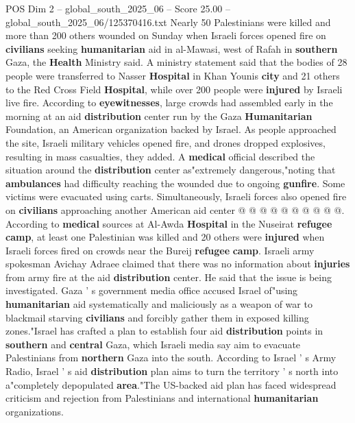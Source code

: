 \begin{textsample}{POS Dim 2 – global\_south\_2025\_06 – Score 25.00 – global\_south\_2025\_06/125370416.txt}  \label{ex:f2_pos_090}
Nearly 50 Palestinians were killed and more than 200 others wounded on Sunday when Israeli forces opened fire on \textbf{civilians} seeking \textbf{humanitarian} aid in al-Mawasi, west of Rafah in \textbf{southern} Gaza, the \textbf{Health} Ministry said.
A ministry statement said that the bodies of 28 people were transferred to Nasser \textbf{Hospital} in Khan Younis \textbf{city} and 21 others to the Red Cross Field \textbf{Hospital}, while over 200 people were \textbf{injured} by Israeli live fire.
According to \textbf{eyewitnesses}, large crowds had assembled early in the morning at an aid \textbf{distribution} center run by the Gaza \textbf{Humanitarian} Foundation, an American organization backed by Israel.
As people approached the site, Israeli military vehicles opened fire, and drones dropped explosives, resulting in mass casualties, they added.
A \textbf{medical} official described the situation around the \textbf{distribution} center as"extremely dangerous,"noting that \textbf{ambulances} had difficulty reaching the wounded due to ongoing \textbf{gunfire}.
Some victims were evacuated using carts.
Simultaneously, Israeli forces also opened fire on \textbf{civilians} approaching another American aid center @ @ @ @ @ @ @ @ @ @.
According to \textbf{medical} sources at Al-Awda \textbf{Hospital} in the Nuseirat \textbf{refugee} \textbf{camp}, at least one Palestinian was killed and 20 others were \textbf{injured} when Israeli forces fired on crowds near the Bureij \textbf{refugee} \textbf{camp}.
Israeli army spokesman Avichay Adraee claimed that there was no information about \textbf{injuries} from army fire at the aid \textbf{distribution} center.
He said that the issue is being investigated.
Gaza ' s government media office accused Israel of"using \textbf{humanitarian} aid systematically and maliciously as a weapon of war to blackmail starving \textbf{civilians} and forcibly gather them in exposed killing zones."Israel has crafted a plan to establish four aid \textbf{distribution} points in \textbf{southern} and \textbf{central} Gaza, which Israeli media say aim to evacuate Palestinians from \textbf{northern} Gaza into the south.
According to Israel ' s Army Radio, Israel ' s aid \textbf{distribution} plan aims to turn the territory ' s north into a"completely depopulated \textbf{area}."The US-backed aid plan has faced widespread criticism and rejection from Palestinians and international \textbf{humanitarian} organizations.

\end{textsample}
